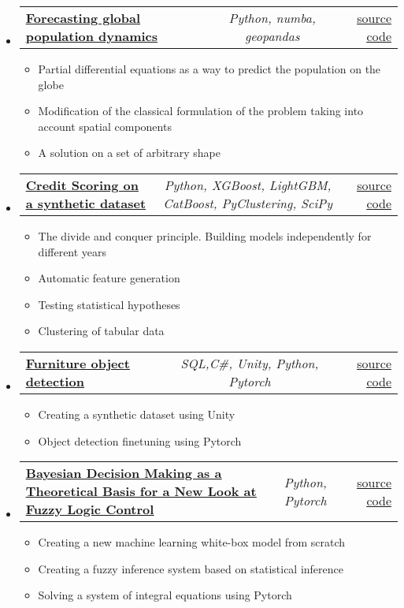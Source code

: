 \documentclass[a4paper,11pt]{article}
\makeatletter
\newcommand{\resumeItem}[1]{
  \item\small{#1}
}
\newcommand{\resumeItemListStart}{\begin{itemize}[rightmargin=0.11in]}
\newcommand{\resumeItemListEnd}{\end{itemize}}
\newcommand{\resumeTrioHeading}[3]{
  \item\small{
    \begin{tabular*}{0.96\textwidth}[t]{
      l@{\extracolsep{\fill}}c@{\extracolsep{\fill}}r
    }
      \textbf{#1} & \textit{#2} & #3
    \end{tabular*}
  }
}
\newcommand{\resumeHeadingListStart}{
  \begin{itemize}[leftmargin=0.15in, label={}]
}
\newcommand{\resumeHeadingListEnd}{\end{itemize}}
\makeatother
\begin{document}
  \resumeHeadingListStart{}
        \resumeTrioHeading{\href{https://github.com/RepnikovPavel/GlobalDynamics}{\uline{Forecasting global population dynamics}}}{Python, numba, geopandas}{\href{https://github.com/RepnikovPavel/GlobalDynamics}{\uline{source code}}}
    \resumeItemListStart{}
    \resumeItem{Partial differential equations as a way to predict the population on the globe}
    \resumeItem{Modification of the classical formulation of the problem taking into account spatial components}
    \resumeItem{A solution on a set of arbitrary shape}
    \resumeItemListEnd{}
    \resumeHeadingListEnd

  \resumeHeadingListStart{}
        \resumeTrioHeading{\href{https://github.com/RepnikovPavel/FinancialData}{\uline{Credit Scoring on a synthetic dataset}}}{Python, XGBoost, LightGBM, CatBoost, PyClustering, SciPy}{\href{https://github.com/RepnikovPavel/FinancialData}{\uline{source code}}}
    \resumeItemListStart{}
    \resumeItem{The divide and conquer principle. Building models independently for different years}
    \resumeItem{Automatic feature generation}
    \resumeItem{Testing statistical hypotheses}
    \resumeItem{Clustering of tabular data}
    \resumeItemListEnd{}
    \resumeHeadingListEnd
    


  \resumeHeadingListStart{}
        \resumeTrioHeading{\href{https://github.com/RepnikovPavel/FurnitureDetection}{\uline{Furniture object detection}}}{ SQL,C\#, Unity, Python, Pytorch}{\href{https://github.com/RepnikovPavel/FurnitureDetection}{\uline{source code}}}
    \resumeItemListStart{}
    \resumeItem{Creating a synthetic dataset using Unity}
    \resumeItem{Object detection finetuning using Pytorch}
    \resumeItemListEnd{}
    \resumeHeadingListEnd

  
  \resumeHeadingListStart{}
    \resumeTrioHeading{\href{https://drive.google.com/drive/u/0/folders/1zftI7n1gPzwnwDx0ypsb0sOc0G7IpfPW}{\uline{Bayesian Decision Making as a Theoretical Basis for a New Look at Fuzzy Logic Control}}}{Python, Pytorch}{\href{https://github.com/RepnikovPavel/statistical_decision_making}{\uline{source code}}}
        \resumeItemListStart{}
        \resumeItem{Creating a new machine learning white-box model from scratch}
        \resumeItem{Creating a fuzzy inference system based on statistical inference}
        \resumeItem{Solving a system of integral equations using Pytorch}
        \resumeItemListEnd{}
\resumeHeadingListEnd
\end{document}
